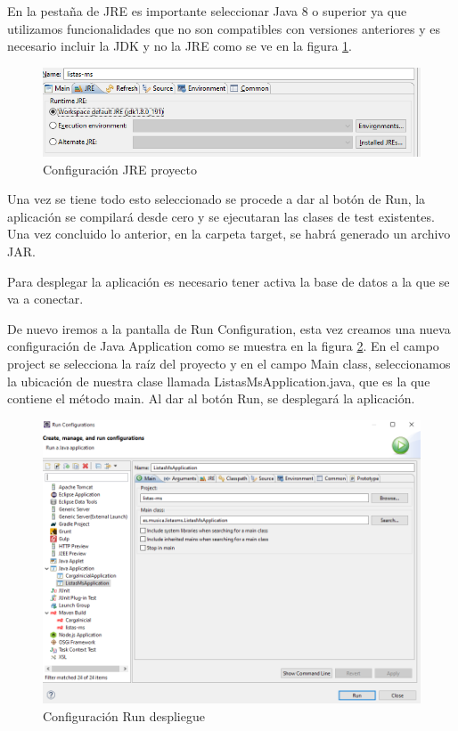\documentclass[12pt]{report} %
\begin{document}
En la pestaña de JRE es importante seleccionar Java 8 o superior ya que utilizamos funcionalidades que no son compatibles con versiones anteriores y es necesario incluir la JDK y no la JRE como se ve en la figura \ref{fig:jremaven}.

\begin{figure}
	\centering
	\includegraphics[width=0.7\linewidth]{imagenes/jreMaven}
	\caption{Configuración JRE proyecto}
	\label{fig:jremaven}
\end{figure}

Una vez se tiene todo esto seleccionado se procede a dar al botón de Run, la aplicación se compilará desde cero y se ejecutaran las clases de test existentes. Una vez concluido lo anterior, en la carpeta target, se habrá generado un archivo JAR.

Para desplegar la aplicación es necesario tener activa la base de datos a la que se va a conectar.

De nuevo iremos a la pantalla de Run Configuration, esta vez creamos una nueva configuración de Java Application como se muestra en la figura \ref{fig:configuraciondespliegue}. En el campo project se selecciona la raíz del proyecto y en el campo Main class, seleccionamos la ubicación de nuestra clase llamada ListasMsApplication.java, que es la que contiene el método main. Al dar al botón Run, se desplegará la aplicación. 

\begin{figure}
	\centering
	\includegraphics[width=0.7\linewidth]{imagenes/configuracionDespliegue}
	\caption{Configuración Run despliegue}
	\label{fig:configuraciondespliegue}
\end{figure}
\end{document}
